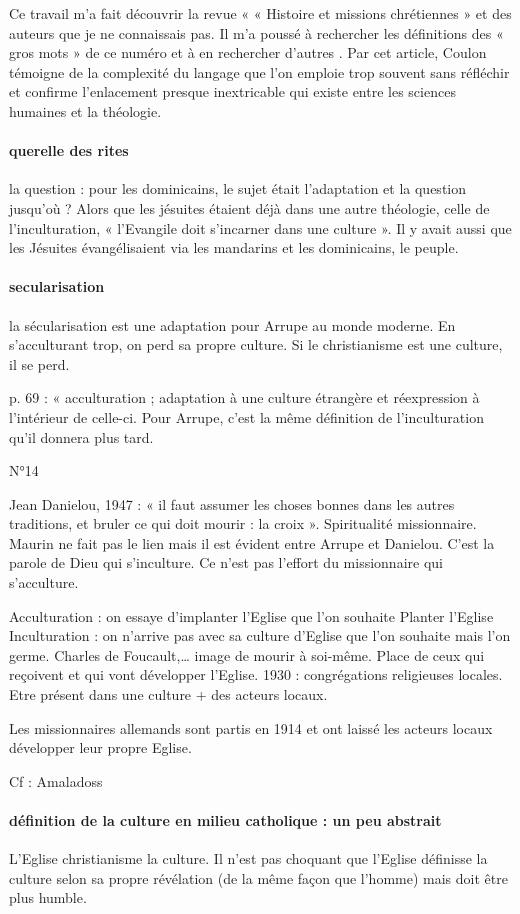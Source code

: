 Ce travail m’a fait découvrir la revue « « Histoire et missions chrétiennes » et des auteurs que je ne connaissais pas.  Il m’a poussé à rechercher les définitions des « gros mots » de ce numéro et à en rechercher d’autres . Par cet article, Coulon témoigne de la complexité du langage que l’on emploie trop souvent sans réfléchir et confirme l’enlacement presque inextricable qui existe entre les sciences humaines et la théologie.   





\paragraph{querelle des rites} la question : pour les dominicains, le sujet était l’adaptation et la question jusqu’où ? Alors que les jésuites étaient déjà dans une autre théologie, celle de l’inculturation, « l’Evangile doit s’incarner dans une culture ». Il y avait aussi que les Jésuites évangélisaient via les mandarins et les dominicains, le peuple. 

\paragraph{secularisation} la sécularisation est une adaptation pour Arrupe au monde moderne. En s’acculturant trop, on perd sa propre culture. Si le christianisme est une culture, il se perd. 

p. 69 : « acculturation ; adaptation à une culture étrangère et réexpression à l’intérieur de celle-ci.
Pour Arrupe, c’est la même définition de l’inculturation qu’il donnera plus tard. 

N°14  


Jean Danielou, 1947 : « il faut assumer les choses bonnes dans les autres traditions, et bruler ce qui doit mourir : la croix ». Spiritualité missionnaire. Maurin ne fait pas le lien mais il est évident entre Arrupe et Danielou.
C’est la parole de Dieu qui s’inculture. Ce n’est pas l’effort du missionnaire qui s’acculture.

Acculturation : on essaye d’implanter l’Eglise que l’on souhaite
Planter l’Eglise
Inculturation : on n’arrive pas avec sa culture d’Eglise que l’on souhaite mais l’on germe. Charles de Foucault,… image de mourir à soi-même.
Place de ceux qui reçoivent et qui vont développer l’Eglise. 1930 : congrégations religieuses locales.
Etre présent dans une culture + des acteurs locaux.
\begin{Ex}
Les missionnaires allemands sont partis en 1914 et ont laissé les acteurs locaux développer leur propre Eglise.
\end{Ex}
Cf : Amaladoss

\paragraph{définition de la culture en milieu catholique : un peu abstrait} L’Eglise christianisme la culture. 
Il n’est pas choquant que l’Eglise définisse la culture selon sa propre révélation (de la même façon que l’homme) mais doit être plus humble.



